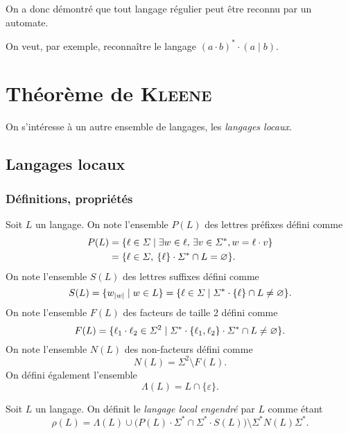 On a donc démontré que tout langage régulier peut être reconnu par un automate.

\begin{exm}
	On veut, par exemple, reconnaître le langage $(a\cdot b)^* \cdot (a \mid b)$.
\end{exm}

\section{Théorème de {\scshape Kleene}}
On s'intéresse à un autre ensemble de langages, les {\it langages locaux}.
\subsection{Langages locaux}
\subsubsection{Définitions, propriétés}

\begin{defn}
	Soit $L$\/ un langage. On note l'ensemble $P(L)$\/ des lettres préfixes défini comme
	\begin{align*}
		P(L) &= \{\ell \in \varSigma  \mid  \exists w \in \ell,\,\exists v \in \varSigma^* , w = \ell\cdot v\}\\
		&= \{\ell \in \varSigma,\: \{\ell\} \cdot \varSigma^* \cap L = \varnothing\}. \\
	\end{align*}
	On note l'ensemble $S(L)$\/ des lettres suffixes défini comme \[
		S(L) = \{w_{|w|} \mid w \in L\} = \{\ell \in \varSigma  \mid  \varSigma^* \cdot \{\ell\}\cap L \neq \varnothing\}
	.\]
	On note l'ensemble $F(L)$\/ des facteurs de taille 2 défini comme \[
		F(L) = \{\ell_1\cdot \ell_2 \in \varSigma^2 \mid \varSigma^* \cdot \{\ell_1,\ell_2\} \cdot \varSigma^* \cap L \neq \varnothing\}
	.\]
	On note l'ensemble $N(L)$\/ des non-facteurs défini comme \[
		N(L) = \Sigma^2 \setminus F(L)
	.\]
	On défini également l'ensemble \[
		\Lambda(L) = L \cap \{\varepsilon\}
	.\]
\end{defn}

\begin{defn}
	Soit $L$\/ un langage. On définit le \textit{langage local engendré} par $L$\/ comme étant \[
		\rho(L) =\Lambda(L) \cup \Big(P(L) \cdot \Sigma^* \cap \Sigma^* \cdot S(L)\Big)\setminus \Sigma^* N(L) \Sigma^*
	.\]
\end{defn}

